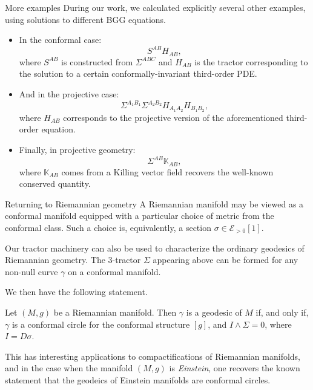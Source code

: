 \documentclass[handout]{beamer}
\begin{document}
\begin{frame}{More examples}
  During our work, we calculated explicitly several other examples, using
  solutions to different BGG equations.\\
  \begin{itemize}
    \pause
    \item In the conformal case:
      \[
      S^{AB} H_{AB},
      \]
      where \( S^{AB} \) is constructed from \( \Sigma^{ABC} \) and
      \( H_{AB} \) is the tractor corresponding to the solution to a certain
      conformally-invariant third-order PDE.
    \pause
    \item And in the projective case:
      \[
        \Sigma^{A_1 B_1} \Sigma^{A_2 B_2} H_{A_1
        A_2} H_{B_1 B_2},
      \]
      where \( H_{A B} \) corresponds to the projective version of the
      aforementioned third-order equation.\\
      \pause
    \item Finally, in projective geometry:
      \[
        \Sigma^{A B} \mathbb{K}_{A B},
      \]
      where \( \mathbb{K}_{A B} \) comes from a Killing vector field recovers the well-known conserved quantity.
  \end{itemize}
\end{frame}

\begin{frame}{Returning to Riemannian geometry}
    A Riemannian manifold may be viewed as a conformal manifold equipped with a particular choice of metric from the conformal class. 
    Such a choice is, equivalently, a section $\sigma \in \mathcal{E}_{>0}[1]$.

    Our tractor machinery can also be used to characterize the ordinary geodesics of Riemannian geometry.
    The 3-tractor $\Sigma$ appearing above can be formed for any non-null curve $\gamma$ on a conformal manifold.

    We then have the following statement.

    \begin{theorem}
      Let $(M,g)$ be a Riemannian manifold. 
      Then $\gamma$ is a geodesic of $M$ if, and only if, $\gamma$ is a conformal circle for the conformal structure $[g]$, and $I\wedge \Sigma = 0$, where $I = D\sigma$.
    \end{theorem}

    This has interesting applications to compactifications of Riemannian manifolds, and in the case when the manifold $(M,g)$ is \emph{Einstein}, one recovers the known statement that the geodeics of Einstein manifolds are conformal circles.
\end{frame}
\end{document}
